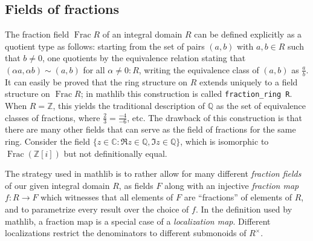 \documentclass[a4paper,USenglish,cleveref, autoref, thm-restate]{lipics-v2021}
\newcommand{\C}{\mathbb{C}}
\newcommand{\lean}[1]{\texttt{#1}\xspace} %
\newcommand{\mathlib}{\textsf{mathlib}\xspace}
\newcommand{\Q}{\mathbb{Q}}
\newcommand{\Z}{\mathbb{Z}}
\DeclareMathOperator{\Frac}{Frac}
\begin{document}
\subsection{Fields of fractions}\label{subsection : fields of fractions}
The fraction field $\Frac R$ of an integral domain $R$ can be defined explicitly as a quotient type as follows:
starting from the set of pairs $(a,b)$ with $a,b \in R$ such that $b\neq 0$,
one quotients by the equivalence relation stating that $(\alpha a, \alpha b) \sim (a,b)$ for all $\alpha \ne 0 : R$, writing the equivalence class of $(a,b)$ as $\frac{a}{b}$.
It can easily be proved that the ring structure on $R$ extends uniquely to a field structure on $\Frac R$;
in \mathlib this construction is called \lean{fraction\_ring R}.
When $R=\Z$, this yields the traditional description of $\Q$ as the set of equivalence classes of fractions, where $\frac{2}{3}=\frac{-4}{-6}$, etc.
The drawback of this construction is that there are many other fields that can serve as the field of fractions for the same ring.
Consider the field $\{z \in \C : \Re z \in \Q, \Im z\in\Q\}$, which is isomorphic to $\Frac (\Z[i])$ but not definitionally equal.

The strategy used in \mathlib is to rather allow for many different \emph{fraction fields} of our given integral domain $R$,
as fields $F$ along with an injective \emph{fraction map} $f : R \to F$ which witnesses that all elements of $F$ are ``fractions'' of elements of $R$,
and to parametrize every result over the choice of $f$.
In the definition used by \mathlib, a fraction map is a special case of a \emph{localization map}.
Different localizations restrict the denominators to different submonoids of $R^\times$.
\end{document}
